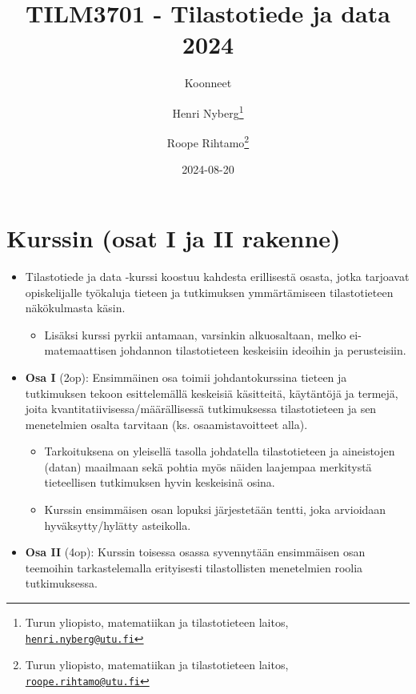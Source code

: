 \documentclass[
]{book}
\title{TILM3701 - Tilastotiede ja data 2024}
\author{Koonneet \and Henri Nyberg\footnote{Turun yliopisto, matematiikan ja tilastotieteen laitos, \href{mailto:henri.nyberg@utu.fi}{\nolinkurl{henri.nyberg@utu.fi}}} \and Roope Rihtamo\footnote{Turun yliopisto, matematiikan ja tilastotieteen laitos, \href{mailto:roope.rihtamo@utu.fi}{\nolinkurl{roope.rihtamo@utu.fi}}}}
\date{2024-08-20}
\providecommand{\tightlist}{%
  \setlength{\itemsep}{0pt}\setlength{\parskip}{0pt}}
\begin{document}
\maketitle

{
\hypersetup{linkcolor=}
\setcounter{tocdepth}{1}
\tableofcontents
}
\hypertarget{kurssin-osat-i-ja-ii-rakenne}{%
\chapter*{Kurssin (osat I ja II rakenne)}\label{kurssin-osat-i-ja-ii-rakenne}}

\begin{itemize}
\tightlist
\item
  Tilastotiede ja data -kurssi koostuu kahdesta erillisestä osasta, jotka tarjoavat opiskelijalle työkaluja tieteen ja tutkimuksen ymmärtämiseen tilastotieteen näkökulmasta käsin.

  \begin{itemize}
  \tightlist
  \item
    Lisäksi kurssi pyrkii antamaan, varsinkin alkuosaltaan, melko ei-matemaattisen johdannon tilastotieteen keskeisiin ideoihin ja perusteisiin.
  \end{itemize}
\item
  \textbf{Osa I} (2op): Ensimmäinen osa toimii johdantokurssina tieteen ja tutkimuksen tekoon esittelemällä keskeisiä käsitteitä, käytäntöjä ja termejä, joita kvantitatiivisessa/määrällisessä tutkimuksessa tilastotieteen ja sen menetelmien osalta tarvitaan (ks. osaamistavoitteet alla).

  \begin{itemize}
  \tightlist
  \item
    Tarkoituksena on yleisellä tasolla johdatella tilastotieteen ja aineistojen (datan) maailmaan sekä pohtia myös näiden laajempaa merkitystä tieteellisen tutkimuksen hyvin keskeisinä osina.
  \item
    Kurssin ensimmäisen osan lopuksi järjestetään tentti, joka arvioidaan hyväksytty/hylätty asteikolla.
  \end{itemize}
\item
  \textbf{Osa II} (4op): Kurssin toisessa osassa syvennytään ensimmäisen osan teemoihin tarkastelemalla erityisesti tilastollisten menetelmien roolia tutkimuksessa.


\end{itemize}
\end{document}
